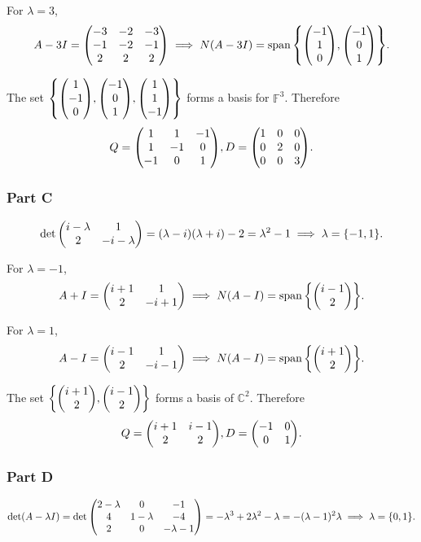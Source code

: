 \documentclass[12pt,titlepage]{extarticle}
\begin{document}
For $\lambda = 3$,
\[
    A - 3 I = \mqty(
    -3 & -2 & -3 \\
     -1 & -2 & -1 \\
     2 & 2 & 2 \\
    ) \implies N(A - 3I) = \spann\qty{
        \mqty(-1 \\ 1 \\ 0),
        \mqty(-1 \\ 0 \\ 1)
    }
.\]

The set $\qty{
    \mqty(1 \\ -1 \\ 0),
    \mqty(-1 \\ 0 \\ 1),
    \mqty(1 \\ 1 \\ -1)
}$ forms a basis for $\mathbb{F}^3$. Therefore
\[
    Q = \mqty(
    1  & 1  & -1 \\
    1  & -1 & 0  \\
    -1 & 0  & 1  
    ),
    D = \mqty(
    \dmat[0]{1,2,3}
    )
.\]

\subsubsection*{Part C}
\[
    \det\mqty(i - \lambda & 1 \\ 2 & -i - \lambda) = (\lambda - i)(\lambda + i) - 2 = \lambda^2 - 1 \implies \lambda = \qty{-1, 1}
.\]

For $\lambda = -1$,
\[
    A + I = \mqty(
        i + 1 & 1 \\
        2  & -i + 1
    ) \implies N(A - I) = \spann\qty{
        \mqty(i-1 \\ 2)
    }
.\]

For $\lambda = 1$,
\[
    A - I = \mqty(
        i - 1 & 1 \\
        2  & -i - 1
    ) \implies N(A - I) = \spann\qty{
        \mqty(i+1 \\ 2)
    }
.\]

The set $\qty{
    \mqty(i+1 \\ 2),
    \mqty(i-1 \\ 2)
}$ forms a basis of $\mathbb{C}^2$. Therefore
\[
    Q = \mqty(
        i + 1 & i - 1 \\
        2 & 2 \\
    ), D = \mqty(\dmat[0]{-1,1})
.\]


\subsubsection*{Part D}
\[
    \det(A - \lambda I) = \det\mqty(
        2-\lambda  & 0 & -1 \\
        4 & 1-\lambda  & -4 \\
        2 & 0 & -\lambda -1 \\
        ) = -\lambda ^3+2 \lambda ^2-\lambda = -(\lambda -1)^2 \lambda \implies \lambda = \qty{0, 1}
.\]
\end{document}
